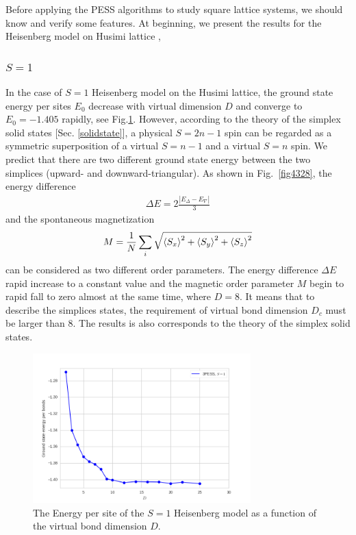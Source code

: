 Before applying the PESS algorithms to study square lattice systems, we should know and verify some features. At beginning, we present the results for the Heisenberg model on Husimi lattice \cite{Husimi1} \cite{Husimi2},

\subsubsection{$S=1$}

In the case of $S=1$ Heisenberg model on the Husimi lattice, the ground state energy per sites $E_0$ decrease with virtual dimension $D$ and converge to $E_0=-1.405$ rapidly, see Fig.\ref{fig4327}. However, according to the theory of the simplex solid states [Sec. \ref{solidstate}], a physical $S=2n-1$ spin can be regarded as a symmetric superposition of a virtual $S=n-1$ and a virtual $S=n$ spin. We predict that there are two different ground state energy between the two simplices (upward- and downward-triangular). As shown in Fig.~\ref{fig4328}, the energy difference
\begin{align}
	\Delta E = 2 \frac{|E_{\Delta}-E_{\nabla}|}{3}
\end{align}
and the spontaneous magnetization
\begin{align}
	M = \frac{1}{N} \sum_{i}{\sqrt{\braket{S_x}^2 + \braket{S_y}^2 + \braket{S_z}^2}}
\end{align}
can be considered as two different order parameters. The energy difference $\Delta E$ rapid increase to a constant value and the magnetic order parameter $M$ begin to rapid fall to zero almost at the same time, where $D=8$. It means that to describe the simplices states, the requirement of virtual bond dimension $D_c$ must be larger than $8$. The results is also corresponds to the theory of the simplex solid states.

\begin{figure}[H]
	\centering
	\includegraphics[width=0.75\textwidth]{figures/3pess_S1GE.png}
	\caption[The Energy per site of the $S=1$ Heisenberg model as a function of the virtual bond dimension $D$]{The Energy per site of the $S=1$ Heisenberg model as a function of the virtual bond dimension $D$.}
	\label{fig4327}
\end{figure}


